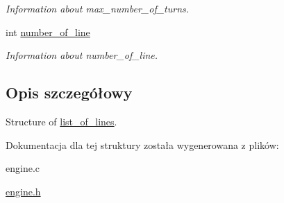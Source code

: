 \begin{DoxyCompactItemize}
\begin{DoxyCompactList}\small\item\em Information about max\-\_\-number\-\_\-of\-\_\-turns. \end{DoxyCompactList}\item 
\hypertarget{structlist__of__lines_a6b2629df46fb4689e6b8ab3c20c7dfbd}{int \hyperlink{structlist__of__lines_a6b2629df46fb4689e6b8ab3c20c7dfbd}{number\-\_\-of\-\_\-line}}\label{structlist__of__lines_a6b2629df46fb4689e6b8ab3c20c7dfbd}

\begin{DoxyCompactList}\small\item\em Information about number\-\_\-of\-\_\-line. \end{DoxyCompactList}\end{DoxyCompactItemize}


\subsection{Opis szczegółowy}
Structure of \hyperlink{structlist__of__lines}{list\-\_\-of\-\_\-lines}. 

Dokumentacja dla tej struktury została wygenerowana z plików\-:\begin{DoxyCompactItemize}
\item 
engine.\-c\item 
\hyperlink{engine_8h}{engine.\-h}\end{DoxyCompactItemize}
